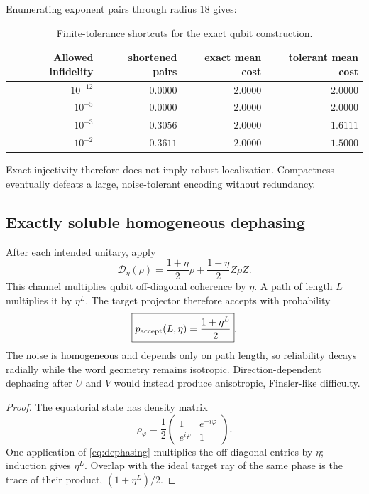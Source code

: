 \documentclass[11pt]{article}
\theoremstyle{definition}
\theoremstyle{remark}
\begin{document}
Enumerating exponent pairs through radius 18 gives:
\begin{table}[t]
\centering
\caption{Finite-tolerance shortcuts for the exact qubit construction.}
\label{tab:tolerance}
\begin{tabular}{rrrr}
\toprule
Allowed infidelity & shortened pairs & exact mean cost & tolerant mean cost\\
\midrule
$10^{-12}$ & $0.0000$ & $2.0000$ & $2.0000$\\
$10^{-5}$  & $0.0000$ & $2.0000$ & $2.0000$\\
$10^{-3}$  & $0.3056$ & $2.0000$ & $1.6111$\\
$10^{-2}$  & $0.3611$ & $2.0000$ & $1.5000$\\
\bottomrule
\end{tabular}
\end{table}
Exact injectivity therefore does not imply robust localization. Compactness
eventually defeats a large, noise-tolerant encoding without redundancy.

\subsection{Exactly soluble homogeneous dephasing}

After each intended unitary, apply
\begin{equation}
 \mathcal D_\eta(\rho)
 =\frac{1+\eta}{2}\rho+\frac{1-\eta}{2}Z\rho Z.
 \label{eq:dephasing}
\end{equation}
This channel multiplies qubit off-diagonal coherence by $\eta$. A path of
length $L$ multiplies it by $\eta^L$. The target projector therefore accepts
with probability
\begin{equation}
 \boxed{
 p_{\rm accept}(L,\eta)=\frac{1+\eta^L}{2}
 }.
 \label{eq:dephasing-solution}
\end{equation}
The noise is homogeneous and depends only on path length, so reliability
decays radially while the word geometry remains isotropic. Direction-dependent
dephasing after $U$ and $V$ would instead produce anisotropic, Finsler-like
difficulty.

\begin{proof}
The equatorial state has density matrix
\begin{equation}
 \rho_\varphi=\frac12
 \begin{pmatrix}1&e^{-i\varphi}\\e^{i\varphi}&1\end{pmatrix}.
\end{equation}
One application of \cref{eq:dephasing} multiplies the off-diagonal entries by
$\eta$; induction gives $\eta^L$. Overlap with the ideal target ray of the
same phase is the trace of their product, $(1+\eta^L)/2$.
\end{proof}
\end{document}
